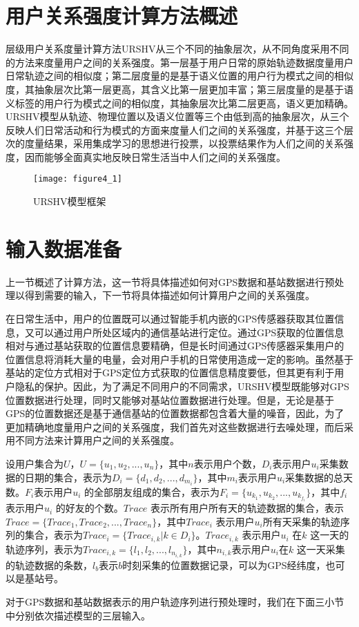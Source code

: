 \section{用户关系强度计算方法概述}
\label{sec:section4-1}
层级用户关系度量计算方法URSHV从三个不同的抽象层次，从不同角度采用不同的方法来度量用户之间的关系强度。第一层基于用户日常的原始轨迹数据度量用户日常轨迹之间的相似度；第二层度量的是基于语义位置的用户行为模式之间的相似度，其抽象层次比第一层更高，其含义比第一层更加丰富；第三层度量的是基于语义标签的用户行为模式之间的相似度，其抽象层次比第二层更高，语义更加精确。URSHV模型从轨迹、物理位置以及语义位置等三个由低到高的抽象层次，从三个反映人们日常活动和行为模式的方面来度量人们之间的关系强度，并基于这三个层次的度量结果，采用集成学习的思想进行投票，以投票结果作为人们之间的关系强度，因而能够全面真实地反映日常生活当中人们之间的关系强度。
\begin{figure}[htp]
\centering
\texttt{[image: figure4\_1]}
\caption{URSHV模型框架}
\label{fig:4_1}
\end{figure}

\section{输入数据准备}
\label{sec:section4-2}
上一节概述了计算方法，这一节将具体描述如何对GPS数据和基站数据进行预处理以得到需要的输入，下一节将具体描述如何计算用户之间的关系强度。
\par 在日常生活中，用户的位置既可以通过智能手机内嵌的GPS传感器获取其位置信息，又可以通过用户所处区域内的通信基站进行定位。通过GPS获取的位置信息相对与通过基站获取的位置信息要精确，但是长时间通过GPS传感器采集用户的位置信息将消耗大量的电量，会对用户手机的日常使用造成一定的影响。虽然基于基站的定位方式相对于GPS定位方式获取的位置信息精度要低，但其更有利于用户隐私的保护。因此，为了满足不同用户的不同需求，URSHV模型既能够对GPS位置数据进行处理，同时又能够对基站位置数据进行处理。但是，无论是基于GPS的位置数据还是基于通信基站的位置数据都包含着大量的噪音，因此，为了更加精确地度量用户之间的关系强度，我们首先对这些数据进行去噪处理，而后采用不同方法来计算用户之间的关系强度。
\par 设用户集合为$U$，$U=\{u_{1},u_{2},...,u_{n}\}$，其中$n$表示用户个数，$D_{i}$表示用户$u_{i}$采集数据的日期的集合，表示为$D_{i}=\{d_{1},d_{2},...,d_{m_{i}}\}$，其中$m_{i}$表示用户$u_{i}$采集数据的总天数。$F_{i}$表示用户$u_{i}$ 的全部朋友组成的集合，表示为$F_{i}=\{u_{k_{1}},u_{k_{2}},...,u_{k_{f_{i}}}\}$，其中$f_{i}$表示用户$u_{i}$ 的好友的个数。$Trace$ 表示所有用户所有天的轨迹数据的集合，表示$Trace=\{Trace_{1},Trace_{2},...,Trace_{n}\}$，其中$Trace_{i}$ 表示用户$u_{i}$所有天采集的轨迹序列的集合，表示为$Trace_{i}=\{Trace_{i,k}|k\in D_{i}\}$。$Trace_{i,k}$ 表示用户$u_{i}$ 在$k$ 这一天的轨迹序列，表示为$Trace_{i,k}=\{l_{1},l_{2},...,l_{n_{i,k}}\}$，其中$n_{i,k}$表示用户$u_i$在$k$ 这一天采集的轨迹数据的条数，$l_b$表示$b$时刻采集的位置数据记录，可以为GPS经纬度，也可以是基站号。
\par 对于GPS数据和基站数据表示的用户轨迹序列进行预处理时，我们在下面三小节中分别依次描述模型的三层输入。

